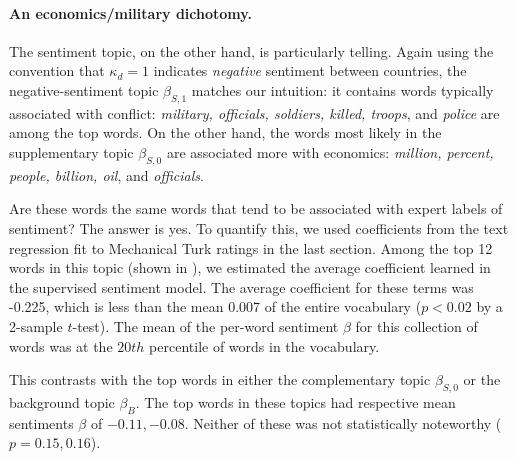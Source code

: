 \paragraph{An economics/military dichotomy.}
The sentiment topic, on the other hand, is particularly telling.
Again using the convention that $\kappa_d=1$ indicates \emph{negative}
sentiment between countries, the negative-sentiment topic
$\beta_{S,1}$ matches our intuition: it contains words typically
associated with conflict: \emph{military, officials, soldiers, killed,
  troops}, and \emph{police} are among the top words. On the other
hand, the words most likely in the supplementary topic $\beta_{S,0}$
are associated more with economics: \emph{million, percent, people,
  billion, oil}, and \emph{officials}.

Are these words the same words that tend to be associated with expert
labels of sentiment?  The answer is yes.  To quantify this, we used
coefficients from the text regression fit to Mechanical Turk ratings
in the last section.  Among the top 12 words in this topic (shown in
), we estimated the average coefficient
learned in the supervised sentiment model.  The average coefficient
for these terms was -0.225, which is less than the mean 0.007 of the
entire vocabulary ($p < 0.02$ by a 2-sample $t$-test).  The mean of
the per-word sentiment $\beta$ for this collection of words was at the
$20th$ percentile of words in the vocabulary.

This contrasts with the top words in either the complementary topic
$\beta_{S,0}$ or the background topic $\beta_{B}$.  The top words in
these topics had respective mean sentiments $\beta$ of $-0.11, -0.08$.
Neither of these was not statistically noteworthy ($p=0.15,0.16$).



